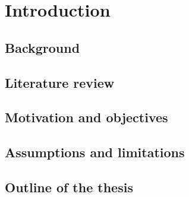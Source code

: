 \chapter{Introduction}

\setcounter{page}{1}
\renewcommand{\thepage}{\arabic{page}}
\section{Background}

\label{sec:background}




\section{Literature review}



\section{Motivation and objectives}
\label{objective}

\section{Assumptions and limitations}


\section{Outline of the thesis}




